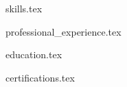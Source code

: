 \documentclass{resume} %
\begin{document}
\vspace{-0.5em}

{skills.tex}

{professional_experience.tex}

{education.tex}

{certifications.tex}
\end{document}
